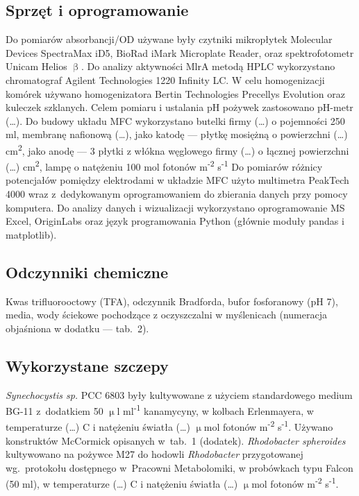 \subsection{Sprzęt i oprogramowanie}\label{subsec:sprzet}
Do pomiarów absorbancji/OD używane były czytniki mikropłytek
Molecular Devices SpectraMax iD5, BioRad iMark
Microplate Reader, oraz spektrofotometr Unicam Helios $\upbeta$.
Do analizy aktywności MlrA metodą HPLC wykorzystano chromatograf
Agilent Technologies 1220 Infinity LC\@.
W celu homogenizacji komórek używano homogenizatora
Bertin Technologies Precellys Evolution oraz kuleczek szklanych.
Celem pomiaru i ustalania pH pożywek zastosowano pH-metr (\ldots).
Do budowy układu MFC wykorzystano butelki firmy (\ldots)
o pojemności 250 ml, membranę nafionową (\ldots),
jako katodę — płytkę mosiężną o powierzchni (\ldots) cm\textsuperscript{2},
jako anodę — 3 płytki z włókna węglowego firmy (\ldots)
o łącznej powierzchni (\ldots) cm\textsuperscript{2},
lampę o natężeniu 100 mol fotonów m\textsuperscript{-2} s\textsuperscript{-1}
Do pomiarów różnicy potencjałów pomiędzy elektrodami
w układzie MFC użyto multimetra PeakTech 4000 wraz
z~dedykowanym oprogramowaniem do zbierania danych przy pomocy komputera.
Do analizy danych i wizualizacji wykorzystano oprogramowanie
MS Excel, OriginLabs oraz język programowania Python
(głównie moduły pandas i matplotlib).

\subsection{Odczynniki chemiczne}\label{subsec:odczynniki}
Kwas trifluorooctowy (TFA), odczynnik Bradforda, bufor fosforanowy (pH 7),
media, wody ściekowe pochodzące z oczyszczalni w myślenicach
(numeracja objaśniona w dodatku — tab.\ 2).

\subsection{Wykorzystane szczepy}\label{subsec:szczepy}
\textit{Synechocystis sp.} PCC 6803 były kultywowane z użyciem
standardowego medium BG-11 z~dodatkiem 50
$\upmu$l ml\textsuperscript{-1} kanamycyny, w kolbach Erlenmayera,
w temperaturze (\ldots) \degree C i natężeniu światła
(\ldots) $\upmu$mol fotonów m\textsuperscript{-2} s\textsuperscript{-1}.
Używano konstruktów McCormick opisanych w~tab.~1 (dodatek).
\textit{Rhodobacter spheroides} kultywowano na pożywce M27
do hodowli \textit{Rhodobacter} przygotowanej wg.\ protokołu
dostępnego w~Pracowni Metabolomiki, w probówkach typu
Falcon (50 ml), w temperaturze (\ldots) \degree C i natężeniu światła
(\ldots) $\upmu$mol fotonów m\textsuperscript{-2} s\textsuperscript{-1}.


